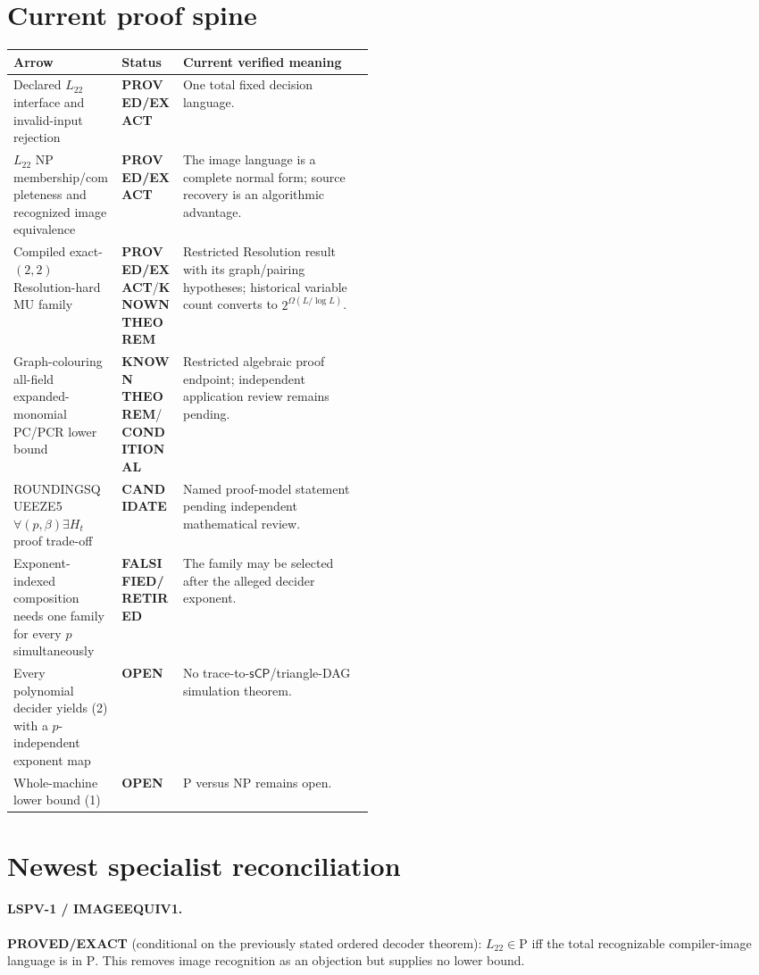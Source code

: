 \documentclass[11pt]{article}
\newcommand{\Ltwo}{L_{22}}
\newcommand{\sCP}{\mathsf{sCP}}
\newcommand{\EXACT}{\textbf{PROVED/EXACT}}
\newcommand{\KNOWN}{\textbf{KNOWN THEOREM}}
\newcommand{\COND}{\textbf{CONDITIONAL}}
\newcommand{\CAND}{\textbf{CANDIDATE}}
\newcommand{\OPEN}{\textbf{OPEN}}
\newcommand{\RET}{\textbf{FALSIFIED/RETIRED}}
\begin{document}
\section{Current proof spine}
\begin{center}
\begin{tabularx}{\linewidth}{p{0.30\linewidth}p{0.17\linewidth}X}
\toprule
Arrow & Status & Current verified meaning\\
\midrule
Declared $\Ltwo$ interface and invalid-input rejection & \EXACT & One total
fixed decision language.\\
$\Ltwo$ NP membership/completeness and recognized image equivalence &
\EXACT & The image language is a complete normal form; source recovery is an
algorithmic advantage.\\
Compiled exact-$(2,2)$ Resolution-hard MU family & \EXACT/\KNOWN & Restricted
Resolution result with its graph/pairing hypotheses; historical variable
count converts to $2^{\Omega(L/\log L)}$.\\
Graph-colouring all-field expanded-monomial PC/PCR lower bound &
\KNOWN/\COND & Restricted algebraic proof endpoint; independent application
review remains pending.\\
ROUNDINGSQUEEZE5 $\forall(p,\beta)\exists H_t$ proof trade-off & \CAND &
Named proof-model statement pending independent mathematical review.\\
Exponent-indexed composition needs one family for every $p$ simultaneously &
\RET & The family may be selected after the alleged decider exponent.\\
Every polynomial decider yields (2) with a $p$-independent exponent map &
\OPEN & No trace-to-$\sCP$/triangle-DAG simulation theorem.\\
Whole-machine lower bound (1) & \OPEN & P versus NP remains open.\\
\bottomrule
\end{tabularx}
\end{center}

\section{Newest specialist reconciliation}
\paragraph{LSPV-1 / IMAGEEQUIV1.}
\EXACT{} (conditional on the previously stated ordered decoder theorem):
$\Ltwo\in\mathrm P$ iff the total recognizable compiler-image language is
in $\mathrm P$. This removes image recognition as an objection but supplies
no lower bound.
\end{document}
